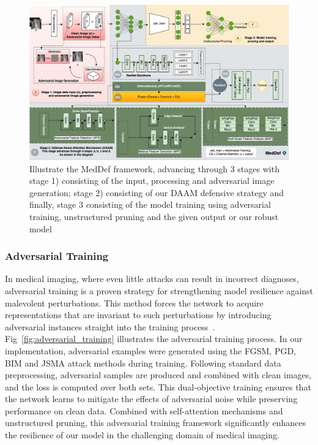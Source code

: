 \documentclass[preprint,12pt]{elsarticle}
\begin{document}
\begin{figure}[!t]
\centering
\includegraphics[width=\columnwidth]{fig/fig2.jpg}
\caption{Illustrate the MedDef framework, advancing through 3 stages with stage 1) consisting of the input, processing and adversarial image generation; stage 2) consisting of our DAAM defensive strategy and finally, stage 3 consisting of the model training using adversarial training, unstructured pruning and the given output or our robust model}
\label{fig:model_architecture}
\end{figure}

\subsubsection{Adversarial Training}
In medical imaging, where even little attacks can result in incorrect diagnoses, adversarial training is a proven strategy for strengthening model resilience against malevolent perturbations. This method forces the network to acquire representations that are invariant to such perturbations by introducing adversarial instances straight into the training process~\cite{Zeng22}. Fig~\ref{fig:adversarial_training} illustrates the adversarial training process. In our implementation, adversarial examples were generated using the FGSM, PGD, BIM and JSMA attack methods during training. Following standard data preprocessing, adversarial samples are produced and combined with clean images, and the loss is computed over both sets. This dual-objective training ensures that the network learns to mitigate the effects of adversarial noise while preserving performance on clean data. Combined with self-attention mechanisms and unstructured pruning, this adversarial training framework significantly enhances the resilience of our model in the challenging domain of medical imaging.
\end{document}
